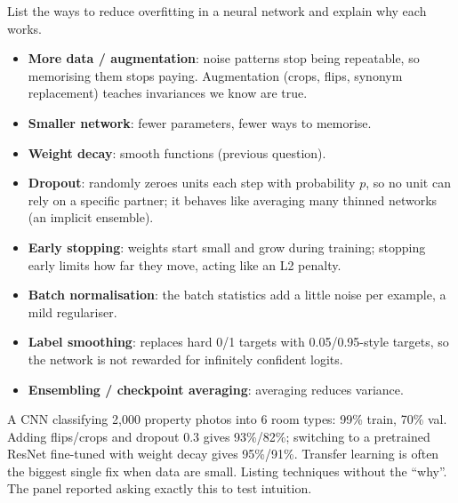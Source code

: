 \begin{qa}{ List the ways to reduce overfitting in a neural network and
explain why each works.}
\why
\begin{itemize}
\item \textbf{More data / augmentation}: noise patterns stop being repeatable, so memorising them stops paying.
  Augmentation (crops, flips, synonym replacement) teaches invariances we know are true.
\item \textbf{Smaller network}: fewer parameters, fewer ways to memorise.
\item \textbf{Weight decay}: smooth functions (previous question).
\item \textbf{Dropout}: randomly zeroes units each step with probability $p$, so no unit can rely on a
  specific partner; it behaves like averaging many thinned networks (an implicit ensemble).
\item \textbf{Early stopping}: weights start small and grow during training; stopping early limits how
  far they move, acting like an L2 penalty.
\item \textbf{Batch normalisation}: the batch statistics add a little noise per example, a mild regulariser.
\item \textbf{Label smoothing}: replaces hard 0/1 targets with 0.05/0.95-style targets, so the network is not
  rewarded for infinitely confident logits.
\item \textbf{Ensembling / checkpoint averaging}: averaging reduces variance.
\end{itemize}
\worked A CNN classifying 2{,}000 property photos into 6 room types: 99\% train, 70\% val. Adding flips/crops
and dropout 0.3 gives 93\%/82\%; switching to a pretrained ResNet fine-tuned with weight decay gives 95\%/91\%.
Transfer learning is often the biggest single fix when data are small.
\pitfall Listing techniques without the ``why''. The panel reported asking exactly this to test intuition.
\end{qa}

